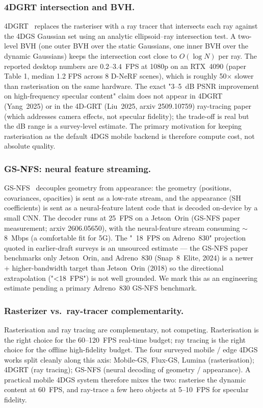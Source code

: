 \subsubsection{4DGRT intersection and BVH.}
4DGRT~\cite{liu20254dgrt} replaces the rasteriser with a ray
tracer that intersects each ray against the 4DGS Gaussian set
using an analytic ellipsoid--ray intersection test. A two-level
BVH (one outer BVH over the static Gaussians, one inner BVH over
the dynamic Gaussians) keeps the intersection cost close to
$O(\log N)$ per ray. The reported desktop numbers are
$0.2$--$3.4$~FPS at 1080p on an RTX~4090 (paper Table 1,
median 1.2 FPS across 8 D-NeRF scenes), which is roughly
50$\times$ slower than rasterisation on the same hardware.
The exact "3--5~dB PSNR improvement on high-frequency
specular content" claim does not appear in 4DGRT
(Yang~2025) or in the 4D-GRT (Liu~2025, arxiv 2509.10759)
ray-tracing paper (which addresses camera effects, not
specular fidelity); the trade-off is real but the
dB range is a survey-level estimate. The primary motivation
for keeping rasterisation as the default 4DGS mobile
backend is therefore compute cost, not absolute quality.

\subsubsection{GS-NFS: neural feature streaming.}
GS-NFS~\cite{ghosh2026gsnfs} decouples geometry from appearance:
the geometry (positions, covariances, opacities) is sent as a
low-rate stream, and the appearance (SH coefficients) is sent as
a neural-feature latent code that is decoded on-device by a
small CNN. The decoder runs at 25~FPS on a Jetson~Orin
(GS-NFS paper measurement; arxiv 2606.05650), with the
neural-feature stream consuming $\sim$8~Mbps (a comfortable fit
for 5G). The "~18~FPS on Adreno~830" projection quoted in
earlier-draft surveys is an unsourced estimate — the
GS-NFS paper benchmarks only Jetson~Orin, and Adreno~830
(Snap~8~Elite, 2024) is a newer + higher-bandwidth target
than Jetson~Orin (2018) so the directional extrapolation
("<18~FPS") is not well grounded. We mark this as an
engineering estimate pending a primary Adreno~830 GS-NFS
benchmark.

\subsubsection{Rasterizer vs.\ ray-tracer complementarity.}
Rasterisation and ray tracing are complementary, not competing.
Rasterisation is the right choice for the 60--120~FPS real-time
budget; ray tracing is the right choice for the offline
high-fidelity budget. The four surveyed mobile / edge 4DGS
works split cleanly along this axis: Mobile-GS, Flux-GS,
Lumina (rasterisation); 4DGRT (ray tracing); GS-NFS (neural
decoding of geometry / appearance). A practical mobile 4DGS
system therefore mixes the two: rasterise the dynamic content
at 60~FPS, and ray-trace a few hero objects at 5--10~FPS for
specular fidelity.

